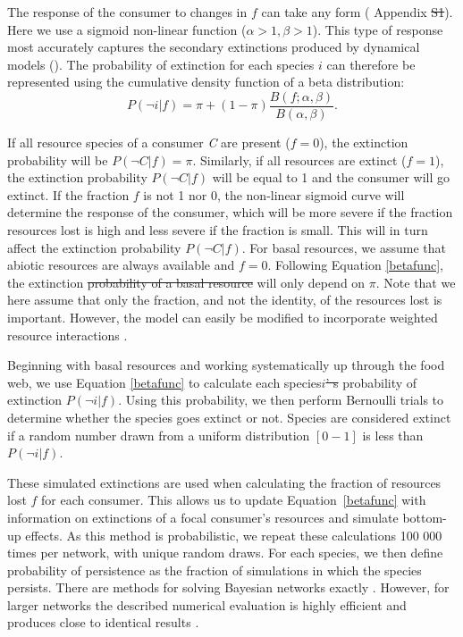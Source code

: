 \documentclass[12pt]{article}
\providecommand{\DIFadd}[1]{{\protect\color{blue}\uwave{#1}}} %
\providecommand{\DIFdel}[1]{{\protect\color{red}\sout{#1}}}                      %
\providecommand{\DIFaddbegin}{} %
\providecommand{\DIFaddend}{} %
\providecommand{\DIFdelbegin}{} %
\providecommand{\DIFdelend}{} %
\newcommand{\DIFscaledelfig}{0.5}
\newlength{\DIFdelgraphicswidth} %
\newlength{\DIFdelgraphicsheight} %
\newcommand{\DIFaddincludegraphics}[2][]{{\color{blue}\fbox{\DIFOincludegraphics[#1]{#2}}}} %
\newcommand{\DIFdelincludegraphics}[2][]{%
\sbox{\DIFdelgraphicsbox}{\DIFOincludegraphics[#1]{#2}}%
\settoboxwidth{\DIFdelgraphicswidth}{\DIFdelgraphicsbox} %
\settoboxtotalheight{\DIFdelgraphicsheight}{\DIFdelgraphicsbox} %
\scalebox{\DIFscaledelfig}{%
\parbox[b]{\DIFdelgraphicswidth}{\usebox{\DIFdelgraphicsbox}\\[-\baselineskip] \rule{\DIFdelgraphicswidth}{0em}}\llap{\resizebox{\DIFdelgraphicswidth}{\DIFdelgraphicsheight}{%
\setlength{\unitlength}{\DIFdelgraphicswidth}%
\begin{picture}(1,1)%
\thicklines\linethickness{2pt} %
{\color[rgb]{1,0,0}\put(0,0){\framebox(1,1){}}}%
{\color[rgb]{1,0,0}\put(0,0){\line( 1,1){1}}}%
{\color[rgb]{1,0,0}\put(0,1){\line(1,-1){1}}}%
\end{picture}%
}\hspace*{3pt}}} %
} %
\DeclareRobustCommand{\DIFaddbegin}{\DIFOaddbegin \let\includegraphics\DIFaddincludegraphics} %
\DeclareRobustCommand{\DIFaddend}{\DIFOaddend \let\includegraphics\DIFOincludegraphics} %
\DeclareRobustCommand{\DIFdelbegin}{\DIFOdelbegin \let\includegraphics\DIFdelincludegraphics} %
\DeclareRobustCommand{\DIFdelend}{\DIFOaddend \let\includegraphics\DIFOincludegraphics} %
\begin{document}
\begin{spacing}{2.0}
        
        The response of the consumer to changes in $f$ can take any form (\DIFdelbegin %
\DIFdelend Appendix \DIFdelbegin \DIFdel{S1}\DIFdelend \DIFaddbegin \emph{\DIFadd{S2}\DIFaddend }). Here we use a sigmoid non-linear function ($\alpha > 1, \beta > 1$).
		This type of response most accurately captures the secondary extinctions produced by dynamical models (\citealp[]{Eklof2013}).
		The probability of extinction for each species $i$ can therefore be represented using the cumulative density function of a beta distribution:
		\begin{equation}
		P(\lnot i|f) = \pi + (1 - \pi) \frac{B(f;\alpha,\beta)}{B(\alpha,\beta)}.
				\label{betafunc}
        \end{equation}

		If all resource species of a consumer \textit{C} are present ($f = 0$), the extinction probability will be $P(\lnot C|f) = \pi$. 
		Similarly, if all resources are extinct ($f = 1$), the extinction probability $P(\lnot C|f)$ will be equal to 1 and the consumer will go extinct.
		If the fraction $f$ is not 1 nor 0, the non-linear sigmoid curve will determine the response of the consumer, which will be more severe if the fraction resources lost is high and less severe if the fraction is small. This will in turn affect the extinction probability $P(\lnot C|f)$.
		For basal resources, we assume that abiotic resources are always available and $f=0$. Following Equation \ref{betafunc}, the extinction \DIFdelbegin \DIFdel{probability of a basal resource }\DIFdelend will only depend on $\pi$.
		Note that we here assume that only the fraction, and not the identity, of the resources lost is important. 
		However, the model can easily be modified to incorporate weighted resource interactions \citep[see][]{Eklof2013}.

		
        Beginning with basal resources and working systematically up through the food web, we use Equation \ref{betafunc} to calculate each species\DIFdelbegin \DIFdel{$i$' s }\DIFdelend \DIFaddbegin \DIFadd{' $i$ }\DIFaddend probability of extinction $P(\lnot i|f)$.
        Using this probability, we then perform Bernoulli trials to determine whether the species goes extinct or not. 
        Species are considered extinct if a random number drawn from a uniform distribution $[0-1]$ is less than $P(\lnot i|f)$.
\DIFaddbegin 


        \DIFaddend These simulated extinctions are used when calculating the fraction of resources lost $f$ for each consumer.
        This allows us to update Equation~\ref{betafunc} with information on extinctions of a focal consumer's resources and simulate bottom-up effects. As this method is probabilistic, we repeat these calculations 100 000 times per network, with unique random draws.
	    For each species, we then define probability of persistence as the fraction of simulations in which the species persists. There are methods for solving Bayesian networks exactly \citep{Eklof2013}.
	    However, for larger networks the described numerical evaluation is highly efficient and produces close to identical results \citep{Haussler2020}.


\end{spacing}
\end{document}
